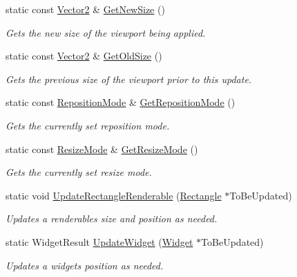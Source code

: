 \begin{DoxyCompactItemize}
static const \hyperlink{classMezzanine_1_1Vector2}{Vector2} \& \hyperlink{classMezzanine_1_1UI_1_1ViewportUpdateTool_a2f1524ae0e1a16d8e990be812aebfe3a}{GetNewSize} ()
\begin{DoxyCompactList}\small\item\em Gets the new size of the viewport being applied. \item\end{DoxyCompactList}\item 
static const \hyperlink{classMezzanine_1_1Vector2}{Vector2} \& \hyperlink{classMezzanine_1_1UI_1_1ViewportUpdateTool_a52e8cfef8e1e4054a7b281c2b42df50e}{GetOldSize} ()
\begin{DoxyCompactList}\small\item\em Gets the previous size of the viewport prior to this update. \item\end{DoxyCompactList}\item 
static const \hyperlink{classMezzanine_1_1UI_1_1ViewportUpdateTool_ad2de82a6fc57859d914845ce676ff67e}{RepositionMode} \& \hyperlink{classMezzanine_1_1UI_1_1ViewportUpdateTool_a6a1dffe6f6ba85063ad34279d6ba5700}{GetRepositionMode} ()
\begin{DoxyCompactList}\small\item\em Gets the currently set reposition mode. \item\end{DoxyCompactList}\item 
static const \hyperlink{classMezzanine_1_1UI_1_1ViewportUpdateTool_a89afdf79f52d5bf18bdffd323911a549}{ResizeMode} \& \hyperlink{classMezzanine_1_1UI_1_1ViewportUpdateTool_a4aca6a54d42ad2bf33b471376549bde2}{GetResizeMode} ()
\begin{DoxyCompactList}\small\item\em Gets the currently set resize mode. \item\end{DoxyCompactList}\item 
static void \hyperlink{classMezzanine_1_1UI_1_1ViewportUpdateTool_ad8659876641f9deea2488dcd9baa02c9}{UpdateRectangleRenderable} (\hyperlink{classMezzanine_1_1UI_1_1Rectangle}{Rectangle} $\ast$ToBeUpdated)
\begin{DoxyCompactList}\small\item\em Updates a renderables size and position as needed. \item\end{DoxyCompactList}\item 
static WidgetResult \hyperlink{classMezzanine_1_1UI_1_1ViewportUpdateTool_af735913610e633fb127b08c146e7d16d}{UpdateWidget} (\hyperlink{classMezzanine_1_1UI_1_1Widget}{Widget} $\ast$ToBeUpdated)
\begin{DoxyCompactList}\small\item\em Updates a widgets position as needed. \item\end{DoxyCompactList}\end{DoxyCompactItemize}
